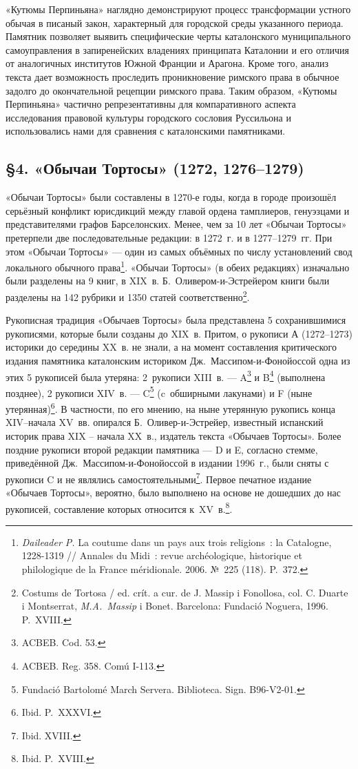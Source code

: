 «Кутюмы Перпиньяна» наглядно демонстрируют процесс трансформации устного обычая в писаный закон, характерный для городской среды указанного периода. Памятник позволяет выявить специфические черты каталонского муниципального самоуправления в запиренейских владениях принципата Каталонии и его отличия от аналогичных институтов Южной Франции и Арагона. Кроме того, анализ текста дает возможность проследить проникновение римского права в обычное задолго до окончательной рецепции римского права. Таким образом, «Кутюмы Перпиньяна» частично репрезентативны для компаративного аспекта исследования правовой культуры городского сословия Руссильона и использовались нами для сравнения с каталонскими памятниками.

\subsection*{§4. «Обычаи Тортосы» (1272, 1276--1279)}

«Обычаи Тортосы» были составлены в 1270-е годы, когда в городе произошёл серьёзный конфликт юрисдикций между главой ордена тамплиеров, генуэзцами и представителями графов Барселонских. Менее, чем за 10 лет «Обычаи Тортосы» претерпели две последовательные редакции: в 1272~г. и в 1277--1279~гг. При этом «Обычаи Тортосы» --- один из самых объёмных по числу установлений свод локального обычного права\footnote{\emph{Daileader P. }La coutume dans un pays aux trois religions~: la Catalogne, 1228-1319 // Annales du Midi~: revue archéologique, historique et philologique de la France méridionale. 2006. №~225 (118). P.~372.}. «Обычаи Тортосы» (в обеих редакциях) изначально были разделены на 9 книг, в XIX~в. Б.~Оливером-и-Эстрейером книги были разделены на 142 рубрики и 1350 статей соответственно\footnote{Costums de Tortosa / ed. crít. a cur. de J. Massip i Fonollosa, col. C. Duarte i Montserrat, \emph{M.A.~Massip} i Bonet. Barcelona: Fundació Noguera, 1996. P.~XVIII.}.

Рукописная традиция «Обычаев Тортосы» была представлена 5 сохранившимися рукописями, которые были созданы до XIX~в. Притом, о рукописи А (1272--1273) историки до середины XX~в. не знали, а на момент составления критического издания памятника каталонским историком Дж.~Массипом-и-Фонойоссой одна из этих 5 рукописей была утеряна: 2~рукописи XIII~в. --- A\footnote{ACBEB. Cod. 53.} и B\footnote{ACBEB. Reg. 358. Comú I-113.} (выполнена позднее), 2 рукописи XIV~в. --- C\footnote{Fundació Bartolomé March Servera. Biblioteca. Sign. B96-V2-01.} (c~обширными лакунами) и F (ныне утерянная)\footnote{Ibid. P.~XXXVI.}. В частности, по его мнению, на ныне утерянную рукопись конца XIV--начала XV~вв. опирался Б.~Оливер-и-Эстрейер, известный испанский историк права XIX -- начала XX~в., издатель текста «Обычаев Тортосы». Более поздние рукописи второй редакции памятника --- D и E, согласно стемме, приведённой Дж.~Массипом-и-Фонойоссой в издании 1996~г., были сняты с рукописи C и не являлись самостоятельными\footnote{Ibid. XVIII.}. Первое печатное издание «Обычаев Тортосы», вероятно, было выполнено на основе не дошедших до нас рукописей, составление которых относится к~XV~в.\footnote{Ibid. P.~XVIII.}.

